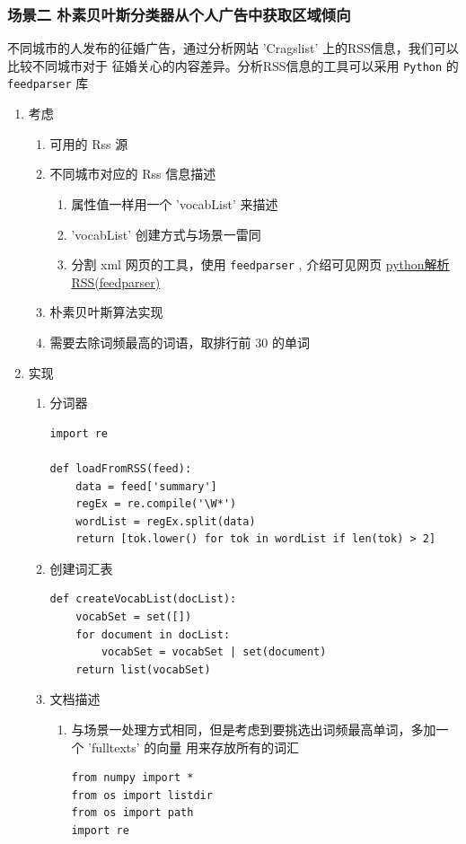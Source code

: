 \documentclass[11pt]{ctexart}
\begin{document}
\subsubsection{场景二 朴素贝叶斯分类器从个人广告中获取区域倾向}
\label{sec:orgheadline44}
不同城市的人发布的征婚广告，通过分析网站 'Cragslist' 上的RSS信息，我们可以比较不同城市对于
征婚关心的内容差异。分析RSS信息的工具可以采用 \texttt{Python} 的 \texttt{feedparser} 库
\begin{enumerate}
\item 考虑
\label{sec:orgheadline42}
\begin{enumerate}
\item 可用的 Rss 源
\item 不同城市对应的 Rss 信息描述
\begin{enumerate}
\item 属性值一样用一个 'vocabList' 来描述
\item 'vocabList' 创建方式与场景一雷同
\item 分割 xml 网页的工具，使用 \texttt{feedparser} , 介绍可见网页
\href{http://www.cnblogs.com/MrLJC/p/3731213.html}{python解析RSS(feedparser)}
\end{enumerate}
\item 朴素贝叶斯算法实现
\item 需要去除词频最高的词语，取排行前 30 的单词
\end{enumerate}
\item 实现
\label{sec:orgheadline43}
\begin{enumerate}
\item 分词器
\lstset{language=Python,label= ,caption= ,captionpos=b,numbers=none}
\begin{lstlisting}
import re

def loadFromRSS(feed):
    data = feed['summary']
    regEx = re.compile('\W*')
    wordList = regEx.split(data)
    return [tok.lower() for tok in wordList if len(tok) > 2]
\end{lstlisting}
\item 创建词汇表
\lstset{language=Python,label= ,caption= ,captionpos=b,numbers=none}
\begin{lstlisting}
def createVocabList(docList):
    vocabSet = set([])
    for document in docList:
        vocabSet = vocabSet | set(document)
    return list(vocabSet)
\end{lstlisting}
\item 文档描述
\begin{enumerate}
\item 与场景一处理方式相同，但是考虑到要挑选出词频最高单词，多加一个 'fulltexts' 的向量
用来存放所有的词汇
\lstset{language=Python,label= ,caption= ,captionpos=b,numbers=none}
\begin{lstlisting}
from numpy import *
from os import listdir
from os import path
import re


\end{lstlisting}
\end{enumerate}
\end{enumerate}
\end{enumerate}
\end{document}
